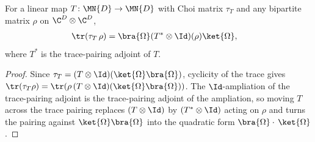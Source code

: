 \begin{theorem}
    \label{thm:trace_choiMatrix_omega_quadratic_adjoint}
    \leanok
    For a linear map $T\colon\MN{D}\to\MN{D}$ with Choi matrix $\tau_T$ and any bipartite
    matrix $\rho$ on $\C^D\otimes\C^D$,
    \begin{align}
        \tr(\tau_T\,\rho)
         & =\bra{\Omega}(T^{*}\otimes\Id)(\rho)\ket{\Omega},
        \notag
    \end{align}
    where $T^{*}$ is the trace-pairing adjoint of $T$.
\end{theorem}

\begin{proof}
    \leanok
    Since $\tau_T=(T\otimes\Id)(\ket{\Omega}\bra{\Omega})$, cyclicity of the trace gives
    $\tr(\tau_T\rho)=\tr(\rho\,(T\otimes\Id)(\ket{\Omega}\bra{\Omega}))$. The
    $\Id$-ampliation of the trace-pairing adjoint is the trace-pairing adjoint of the
    ampliation, so moving $T$ across the trace pairing replaces
    $(T\otimes\Id)$ by $(T^{*}\otimes\Id)$ acting on $\rho$ and turns the pairing against
    $\ket{\Omega}\bra{\Omega}$ into the quadratic form $\bra{\Omega} \cdot\,\ket{\Omega}$.
\end{proof}
